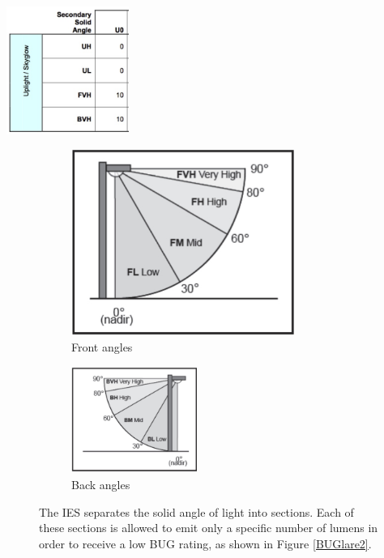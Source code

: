 \documentclass[12pt, oneside]{article}
\begin{document}
\begin{table}[p]
	\centering
	\includegraphics[width=0.3\textwidth]{uprate.jpg}
	\caption[BUG uplighting rating table]{The amount of lumens allowed in each solid angle - Uplight High (UH), Uplight Low (UL), Front Very High (FVH), and Back Very High (BVH). This regulates the total amount of light emitted above 80\degree from vertical.}
	\label{BUp2}
\end{table}
\begin{figure}[p]
	\begin{subfigure} [b] {0.45\textwidth}
		\centering
		\includegraphics[width=0.8\textwidth]{glare.jpg}
		\caption{Front angles}
		\label{BUGlare:front}
	\end{subfigure}
	\hfill
	\begin{subfigure} [b] {0.8\textwidth}
		\centering
		\includegraphics[width=0.45\textwidth]{backlight.jpg}
		\caption{Back angles}
		\label{BUGlare:back}
	\end{subfigure}
	\caption[BUG glare solid angles]{The IES separates the solid angle of light into sections. Each of these sections is allowed to emit only a specific number of lumens in order to receive a low BUG rating, as shown in Figure \ref{BUGlare2}.}
	\label{BUGlare}
\end{figure}
\end{document}

